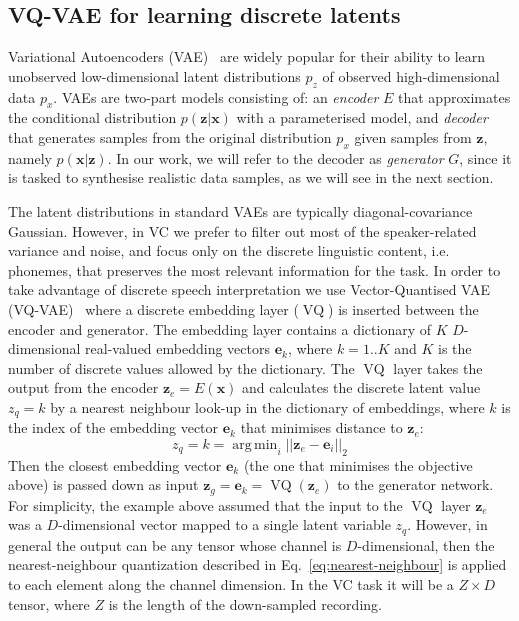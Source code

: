 \documentclass{article}
\DeclareMathOperator*{\argmin}{arg\,min}
\DeclareMathOperator{\VQ}{VQ}
\begin{document}
\subsection{VQ-VAE for learning discrete latents}
\label{sec:methodology:vq-vae}
Variational Autoencoders (VAE)~\cite{Kingma2013} are widely popular for their ability to learn unobserved low-dimensional latent distributions $p_z$ of observed high-dimensional data $p_x$. VAEs are two-part models consisting of: an \textit{encoder} $E$  that approximates the conditional distribution $p(\mathbf{z}|\mathbf{x})$ with a parameterised model, and \textit{decoder} that generates samples from the original distribution $p_x$ given samples from $\mathbf{z}$, namely $p(\mathbf{x}|\mathbf{z})$.
In our work, we will refer to the decoder as \textit{generator} $G$, since it is tasked to synthesise realistic data samples, as we will see in the next section.

The latent distributions in standard VAEs are typically diagonal-covariance Gaussian. 
However, in VC we prefer to filter out most of the speaker-related variance and noise, and focus only on the discrete linguistic content, i.e. phonemes, that preserves the most relevant information for the task. 
In order to take advantage of discrete speech interpretation we use Vector-Quantised VAE (VQ-VAE)~\citep{VandenOord2017} where a discrete embedding layer ($\VQ$) is inserted between the encoder and generator.
The embedding layer contains a dictionary of $K$ $D$-dimensional real-valued embedding vectors $\mathbf{e}_k$, where $k = 1..K$ and $K$ is the number of discrete values allowed by the dictionary.
The $\VQ$ layer takes the output from the encoder $\mathbf{z}_e = E({\mathbf{x}})$ and calculates the discrete latent value $z_q=k$ by a nearest neighbour look-up in the dictionary of embeddings, where $k$ is the index of the embedding vector $\mathbf{e}_k$ that minimises distance to $\mathbf{z}_e$:
\begin{equation}
    \label{eq:nearest-neighbour}
    z_q = k = \argmin_i || \mathbf{z}_e - \mathbf{e}_i ||_2
\end{equation}
Then the closest embedding vector $\mathbf{e}_k$ (the one that minimises the objective above) is passed down as input $\mathbf{z}_g = \mathbf{e}_k = \VQ(\mathbf{z}_e)$ to the generator network. For simplicity, the example above assumed that the input to the $\VQ$ layer $\mathbf{z}_e$ was a $D$-dimensional vector mapped to a single latent variable $z_q$. 
However, in general the output can be any tensor whose channel is $D$-dimensional, then the nearest-neighbour quantization described in Eq.~\ref{eq:nearest-neighbour} is applied to each element along the channel dimension.
In the VC task it will be a $Z \times D$ tensor, where $Z$ is the length of the down-sampled recording.
\end{document}
